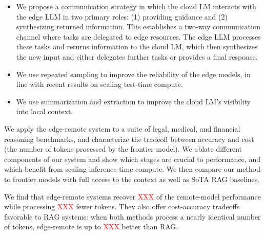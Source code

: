 \begin{itemize}
    \item We propose a communication strategy in which the cloud LM interacts with the edge LLM in two primary roles: (1) providing guidance and (2) synthesizing returned information. This establishes a two-way communication channel where tasks are delegated to edge resources. The edge LLM processes these tasks and returns information to the cloud LM, which then synthesizes the new input and either delegates further tasks or provides a final response.  
    \item We use repeated sampling to improve the reliability of the edge models, in line with recent results on scaling test-time compute. 
    \item We use summarization and extraction to improve the cloud LM's visibility into local context. 
\end{itemize}

We apply the edge-remote system to a suite of legal, medical, and financial reasoning benchmarks, and characterize the tradeoff between accuracy and cost (the number of tokens processed by the frontier model). We ablate different components of our system and show which stages are crucial to performance, and which benefit from scaling inference-time compute. We then compare our method to frontier models with full access to the context as well as SoTA RAG baselines. 

We find that edge-remote systems recover \textcolor{red}{XXX} of the remote-model performance while processing \textcolor{red}{XXX} fewer tokens. They also offer cost-accuracy tradeoffs favorable to RAG systems: when both methods process a nearly identical number of tokens, edge-remote is up to \textcolor{red}{XXX} better than RAG.
